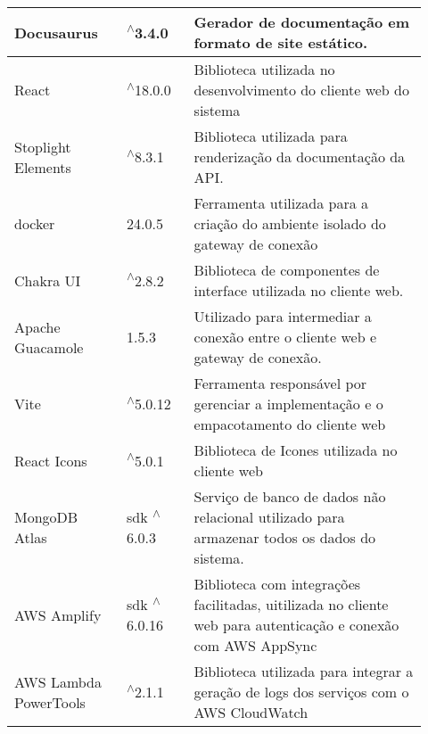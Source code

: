\begin{longtable}{p{0.25\linewidth} p{0.15\linewidth} p{0.525\linewidth}}
\hline

Docusaurus & \textsuperscript{$\wedge$}3.4.0 & Gerador de documentação em formato de site estático. \\

\hline

React & \textsuperscript{$\wedge$}18.0.0 & Biblioteca utilizada no desenvolvimento do cliente web do sistema \\

\hline

Stoplight Elements & \textsuperscript{$\wedge$}8.3.1 & Biblioteca utilizada para renderização da documentação da API. \\

\hline

docker & 24.0.5 & Ferramenta utilizada para a criação do ambiente isolado do gateway de conexão \\

\hline

Chakra UI & \textsuperscript{$\wedge$}2.8.2 & Biblioteca de componentes de interface utilizada no cliente web. \\

\hline

Apache Guacamole & 1.5.3 & Utilizado para intermediar a conexão entre o cliente web e gateway de conexão. \\

\hline

Vite & \textsuperscript{$\wedge$}5.0.12 & Ferramenta responsável por gerenciar a implementação e o empacotamento do cliente web \\

\hline

React Icons & \textsuperscript{$\wedge$}5.0.1 & Biblioteca de Icones utilizada no cliente web \\

\hline

MongoDB Atlas & sdk \textsuperscript{$\wedge$}6.0.3 & Serviço de banco de dados não relacional utilizado para armazenar todos os dados do sistema. \\

\hline

AWS Amplify & sdk \textsuperscript{$\wedge$}6.0.16 & Biblioteca com integrações facilitadas, uitilizada no cliente web para autenticação e conexão com AWS AppSync \\

\hline

AWS Lambda PowerTools & \textsuperscript{$\wedge$}2.1.1 & Biblioteca utilizada para integrar a geração de logs dos serviços com o AWS CloudWatch \\


\end{longtable}
